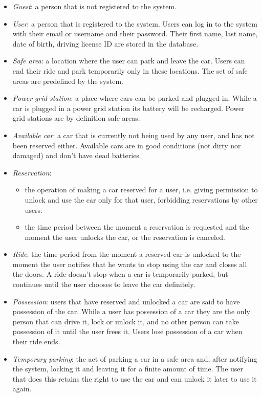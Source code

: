 \documentclass[english]{article}
\begin{document}
\begin{itemize}
\item{\textit{Guest}: a person that is not registered to the system.}
\item{\textit{User}: a person that is registered to the system. Users can log in to the system with their email or username and their password. Their first name, last name, date of birth, driving license ID are stored in the database.}
\item{\textit{Safe area}: a location where the user can park and leave the car. Users can end their ride and park temporarily only in these locations. The set of safe areas are predefined by the system.}
\item{\textit{Power grid station}: a place where cars can be parked and plugged in. While a car is plugged in a power grid station its battery will be recharged. Power grid stations are by definition safe areas.}
\item{\textit{Available car}: a car that is currently not being used by any user, and has not been reserved either. Available cars are in good conditions (not dirty nor damaged) and don’t have dead batteries.}
\item{\textit{Reservation}: 
	\begin{itemize}
		\item{the operation of making a car reserved for a user, i.e. giving permission to unlock and use the car only for that user, forbidding reservations by other users.}
		\item{the time period between the moment a reservation is requested and the moment the user unlocks the car, or the reservation is canceled.}
	\end{itemize}
}
\item{\textit{Ride}: the time period from the moment a reserved car is unlocked to the moment the user notifies that he wants to stop using the car and closes all the doors. A ride doesn’t stop when a car is temporarily parked, but continues until the user chooses to leave the car definitely.}
\item{\textit{Possession}: users that have reserved and unlocked a car are said to have possession of the car. While a user has possession of a car they are the only person that can drive it, lock or unlock it, and no other person can take possession of it until the user frees it. Users lose possession of a car when their ride ends.}
\item{\textit{Temporary parking}: the act of parking a car in a safe area and, after notifying the system, locking it and leaving it for a finite amount of time. The user that does this retains the right to use the car and can unlock it later to use it again.}

\end{itemize}
\end{document}
